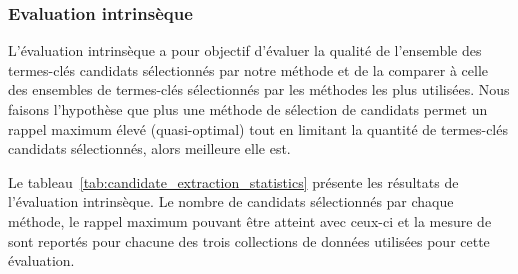       \subsubsection{Evaluation intrinsèque}
      \label{subsubsec:main-automatic_keyphrase_annotation-keyphrase_candidate_selection-evaluation-intrinsic_evaluation}
        L'évaluation intrinsèque a pour objectif d'évaluer la qualité de
        l'ensemble des termes-clés candidats sélectionnés par notre méthode et
        de la comparer à celle des ensembles de termes-clés sélectionnés par les
        méthodes les plus utilisées. Nous faisons l'hypothèse que plus une
        méthode de sélection de candidats permet un rappel maximum élevé
        (quasi-optimal) tout en limitant la quantité de termes-clés candidats
        sélectionnés, alors meilleure elle est.

        Le tableau~\ref{tab:candidate_extraction_statistics} présente les
        résultats de l'évaluation intrinsèque. Le nombre de candidats
        sélectionnés par chaque méthode, le rappel maximum pouvant être atteint
        avec ceux-ci et la mesure de  sont reportés pour chacune des
        trois collections de données utilisées pour cette évaluation.
        \begin{table}[!h]
          \centering
          \caption{Résultats de l'évaluation intrinsèque des méthodes de
                   sélection des termes-clés candidats
                   \label{tab:candidate_extraction_statistics}}
        \end{table}
        
